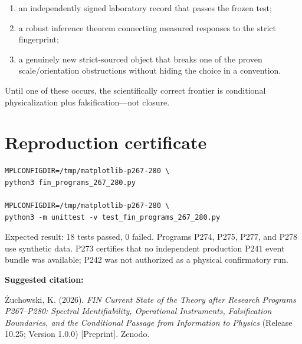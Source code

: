 \documentclass[11pt,a4paper,openany]{report}
\begin{document}
\begin{enumerate}
\item 
an independently signed laboratory record that passes the frozen test;

\item 
a robust inference theorem connecting measured responses to the strict fingerprint;

\item 
a genuinely new strict-sourced object that breaks one of the proven scale/\allowbreak{}orientation obstructions without hiding the choice in a convention.

\end{enumerate}

Until one of these occurs, the scientifically correct frontier is conditional physicalization plus falsification---not closure.


\clearpage
\chapter*{Reproduction certificate}
\begin{Verbatim}[fontsize=\small]
MPLCONFIGDIR=/tmp/matplotlib-p267-280 \
python3 fin_programs_267_280.py

MPLCONFIGDIR=/tmp/matplotlib-p267-280 \
python3 -m unittest -v test_fin_programs_267_280.py
\end{Verbatim}
Expected result: 18 tests passed, 0 failed. Programs P274, P275, P277, and P278
use synthetic data. P273 certifies that no independent production P241 event
bundle was available; P242 was not authorized as a physical confirmatory run.

\medskip
\noindent\textbf{Suggested citation:}

\.Zuchowski, K. (2026). \emph{FIN Current State of the Theory after Research
Programs P267--P280: Spectral Identifiability, Operational Instruments,
Falsification Boundaries, and the Conditional Passage from Information to
Physics} (Release 10.25; Version 1.0.0) [Preprint]. Zenodo.
\end{document}
